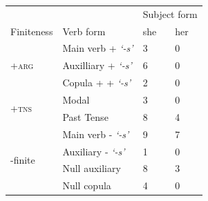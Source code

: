 \begin{table}[!h]
\begin{minipage}[t]{0.5\textwidth}
    \end{minipage}
\begin{minipage}[t]{0.5\textwidth}
    \centering
    \small
 \begin{tabular}{llll}
\toprule
 &  & \multicolumn{2}{l}{Subject form} \\ \cline{3-4} 
Finiteness & Verb form & she & her \\ \hline
\multirow{3}{*}{\textsc{+arg}} & Main verb + \textit{`-s'} & 3 & 0 \\
 & Auxilliary + \textit{`-s'} & 6 & 0 \\
 & Copula + + \textit{`-s'} & 2 & 0 \\ \hline
\multirow{2}{*}{\textsc{+tns}} & Modal & 3 & 0 \\
 & Past Tense & 8 & 4 \\ \hline
\multirow{4}{*}{-finite} & Main verb - \textit{`-s'} & 9 & 7 \\
 & Auxiliary - \textit{`-s'} & 1 & 0 \\
 & Null auxiliary & 8 & 3 \\
 & Null copula & 4 & 0\\
 \bottomrule
\end{tabular}
\end{minipage}
\end{table}
\FloatBarrier

